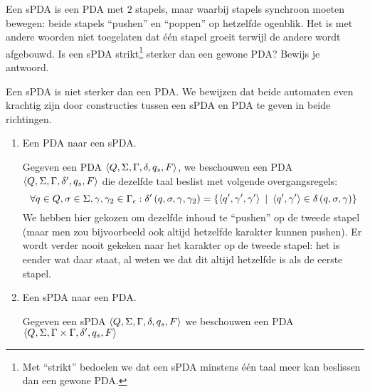 \documentclass{article}
\begin{document}
\begin{question}
Een sPDA is een PDA met $2$ stapels, maar waarbij stapels synchroon moeten bewegen: beide stapels ``pushen'' en ``poppen'' op hetzelfde ogenblik. Het is met andere woorden niet toegelaten dat \'e\'en stapel groeit terwijl de andere wordt afgebouwd. Is een sPDA strikt\footnote{Met ``strikt'' bedoelen we dat een sPDA minstens \'e\'en taal meer kan beslissen dan een gewone PDA.} sterker dan een gewone PDA? Bewijs je antwoord.
\begin{answer}
Een sPDA is niet sterker dan een PDA. We bewijzen dat beide automaten even krachtig zijn door constructies tussen een sPDA en PDA te geven in beide richtingen.
\begin{enumerate}
 \item Een PDA naar een sPDA.
 \begin{construction}
  Gegeven een PDA $\left\langle Q,\Sigma,\Gamma,\delta,q_s,F \right\rangle$, we beschouwen een PDA $\left\langle Q,\Sigma,\Gamma,\delta',q_s,F \right\rangle$ die dezelfde taal beslist met volgende overgangsregels:
  \begin{equation}
  \forall q\in Q,\sigma\in\Sigma,\gamma,\gamma_2\in\Gamma_{\epsilon}:\delta'\left( q,\sigma,\gamma,\gamma_2 \right)=\left\{ \left\langle q',\gamma',\gamma' \right\rangle\ |\ \left\langle q',\gamma' \right\rangle\in\delta\left( q,\sigma,\gamma \right) \right\}
  \end{equation}
  We hebben hier gekozen om dezelfde inhoud te ``pushen'' op de tweede stapel (maar men zou bijvoorbeeld ook altijd hetzelfde karakter kunnen pushen). Er wordt verder nooit gekeken naar het karakter op de tweede stapel: het is eender wat daar staat, al weten we dat dit altijd hetzelfde is als de eerste stapel.
 \end{construction}
 \item Een sPDA naar een PDA.
 \begin{construction}
  Gegeven een sPDA $\left\langle Q,\Sigma,\Gamma,\delta,q_s,F \right\rangle$ we beschouwen een PDA $\left\langle Q,\Sigma,\Gamma\times\Gamma,\delta',q_s,F \right\rangle$
 \end{construction}
\end{enumerate}
\end{answer}
\end{question}
\end{document}
